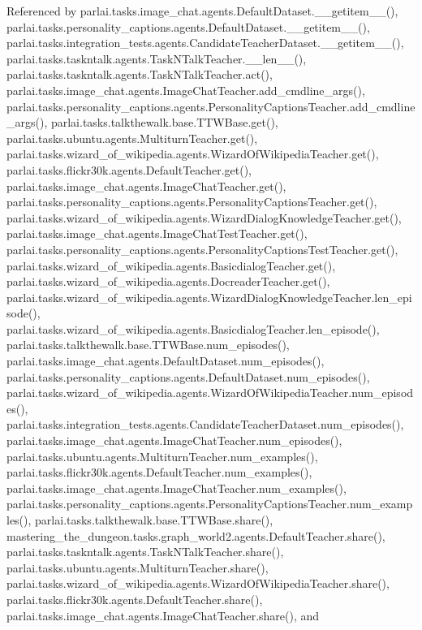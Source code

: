 Referenced by parlai.\+tasks.\+image\+\_\+chat.\+agents.\+Default\+Dataset.\+\_\+\+\_\+getitem\+\_\+\+\_\+(), parlai.\+tasks.\+personality\+\_\+captions.\+agents.\+Default\+Dataset.\+\_\+\+\_\+getitem\+\_\+\+\_\+(), parlai.\+tasks.\+integration\+\_\+tests.\+agents.\+Candidate\+Teacher\+Dataset.\+\_\+\+\_\+getitem\+\_\+\+\_\+(), parlai.\+tasks.\+taskntalk.\+agents.\+Task\+N\+Talk\+Teacher.\+\_\+\+\_\+len\+\_\+\+\_\+(), parlai.\+tasks.\+taskntalk.\+agents.\+Task\+N\+Talk\+Teacher.\+act(), parlai.\+tasks.\+image\+\_\+chat.\+agents.\+Image\+Chat\+Teacher.\+add\+\_\+cmdline\+\_\+args(), parlai.\+tasks.\+personality\+\_\+captions.\+agents.\+Personality\+Captions\+Teacher.\+add\+\_\+cmdline\+\_\+args(), parlai.\+tasks.\+talkthewalk.\+base.\+T\+T\+W\+Base.\+get(), parlai.\+tasks.\+ubuntu.\+agents.\+Multiturn\+Teacher.\+get(), parlai.\+tasks.\+wizard\+\_\+of\+\_\+wikipedia.\+agents.\+Wizard\+Of\+Wikipedia\+Teacher.\+get(), parlai.\+tasks.\+flickr30k.\+agents.\+Default\+Teacher.\+get(), parlai.\+tasks.\+image\+\_\+chat.\+agents.\+Image\+Chat\+Teacher.\+get(), parlai.\+tasks.\+personality\+\_\+captions.\+agents.\+Personality\+Captions\+Teacher.\+get(), parlai.\+tasks.\+wizard\+\_\+of\+\_\+wikipedia.\+agents.\+Wizard\+Dialog\+Knowledge\+Teacher.\+get(), parlai.\+tasks.\+image\+\_\+chat.\+agents.\+Image\+Chat\+Test\+Teacher.\+get(), parlai.\+tasks.\+personality\+\_\+captions.\+agents.\+Personality\+Captions\+Test\+Teacher.\+get(), parlai.\+tasks.\+wizard\+\_\+of\+\_\+wikipedia.\+agents.\+Basicdialog\+Teacher.\+get(), parlai.\+tasks.\+wizard\+\_\+of\+\_\+wikipedia.\+agents.\+Docreader\+Teacher.\+get(), parlai.\+tasks.\+wizard\+\_\+of\+\_\+wikipedia.\+agents.\+Wizard\+Dialog\+Knowledge\+Teacher.\+len\+\_\+episode(), parlai.\+tasks.\+wizard\+\_\+of\+\_\+wikipedia.\+agents.\+Basicdialog\+Teacher.\+len\+\_\+episode(), parlai.\+tasks.\+talkthewalk.\+base.\+T\+T\+W\+Base.\+num\+\_\+episodes(), parlai.\+tasks.\+image\+\_\+chat.\+agents.\+Default\+Dataset.\+num\+\_\+episodes(), parlai.\+tasks.\+personality\+\_\+captions.\+agents.\+Default\+Dataset.\+num\+\_\+episodes(), parlai.\+tasks.\+wizard\+\_\+of\+\_\+wikipedia.\+agents.\+Wizard\+Of\+Wikipedia\+Teacher.\+num\+\_\+episodes(), parlai.\+tasks.\+integration\+\_\+tests.\+agents.\+Candidate\+Teacher\+Dataset.\+num\+\_\+episodes(), parlai.\+tasks.\+image\+\_\+chat.\+agents.\+Image\+Chat\+Teacher.\+num\+\_\+episodes(), parlai.\+tasks.\+ubuntu.\+agents.\+Multiturn\+Teacher.\+num\+\_\+examples(), parlai.\+tasks.\+flickr30k.\+agents.\+Default\+Teacher.\+num\+\_\+examples(), parlai.\+tasks.\+image\+\_\+chat.\+agents.\+Image\+Chat\+Teacher.\+num\+\_\+examples(), parlai.\+tasks.\+personality\+\_\+captions.\+agents.\+Personality\+Captions\+Teacher.\+num\+\_\+examples(), parlai.\+tasks.\+talkthewalk.\+base.\+T\+T\+W\+Base.\+share(), mastering\+\_\+the\+\_\+dungeon.\+tasks.\+graph\+\_\+world2.\+agents.\+Default\+Teacher.\+share(), parlai.\+tasks.\+taskntalk.\+agents.\+Task\+N\+Talk\+Teacher.\+share(), parlai.\+tasks.\+ubuntu.\+agents.\+Multiturn\+Teacher.\+share(), parlai.\+tasks.\+wizard\+\_\+of\+\_\+wikipedia.\+agents.\+Wizard\+Of\+Wikipedia\+Teacher.\+share(), parlai.\+tasks.\+flickr30k.\+agents.\+Default\+Teacher.\+share(), parlai.\+tasks.\+image\+\_\+chat.\+agents.\+Image\+Chat\+Teacher.\+share(), and 